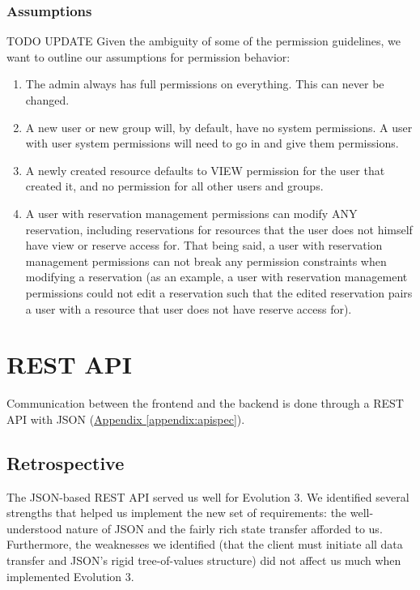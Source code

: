 \documentclass[12pt]{article}
\begin{document}
\subsubsection{Assumptions}
{\huge TODO UPDATE}
Given the ambiguity of some of the permission guidelines, we want to outline our assumptions for permission behavior:
\begin{enumerate}
    \item The admin always has full permissions on everything. This can never be changed. 
    \item A new user or new group will, by default, have no system permissions. A user with user system permissions will need to go in and give them permissions. 
    \item A newly created resource defaults to VIEW permission for the user that created it, and no permission for all other users and groups. 
    \item A user with reservation management permissions can modify ANY reservation, including reservations for resources that the user does not himself have view or reserve access for. That being said, a user with reservation management permissions can not break any permission constraints when modifying a reservation (as an example, a user with reservation management permissions could not edit a reservation such that the edited reservation pairs a user with a resource that user does not have reserve access for). 
\end{enumerate}



\section{REST API}
\label{sec:REST}
Communication between the frontend and the backend is done through a REST API with JSON (\hyperref[appendix:apispec]{Appendix \ref{appendix:apispec}}).

\subsection{Retrospective}
The JSON-based REST API served us well for Evolution 3. We identified several strengths that helped us implement the new set of requirements: the well-understood nature of JSON and the fairly rich state transfer afforded to us. Furthermore, the weaknesses we identified (that the client must initiate all data transfer and JSON's rigid tree-of-values structure) did not affect us much when implemented Evolution 3.
\end{document}

